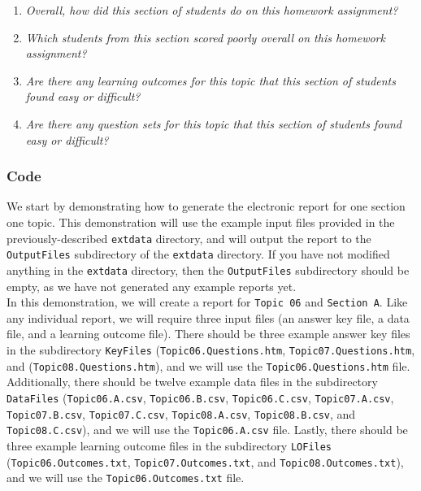 \documentclass{article}\usepackage[]{graphicx}\usepackage[]{color}
\numberwithin{equation}{section} %
\begin{document}
\begin{enumerate}
\item \textit{Overall, how did this section of students do on this homework assignment?}
\item \textit{Which students from this section scored poorly overall on this homework assignment?}
\item \textit{Are there any learning outcomes for this topic that this section of students found easy or difficult?}
\item \textit{Are there any question sets for this topic that this section of students found easy or difficult?}
\end{enumerate}

\subsubsection{Code}
\label{sec:codeOnce}

We start by demonstrating how to generate the electronic report for one section one topic. This demonstration will use the example input files provided in the previously-described \texttt{extdata} directory, and will output the report to the \texttt{OutputFiles} subdirectory of the \texttt{extdata} directory. If you have not modified anything in the \texttt{extdata} directory, then the \texttt{OutputFiles} subdirectory should be empty, as we have not generated any example reports yet. \\

In this demonstration, we will create a report for \texttt{Topic 06} and \texttt{Section A}. Like any individual report, we will require three input files (an answer key file, a data file, and a learning outcome file). There should be three example answer key files in the subdirectory \texttt{KeyFiles} (\texttt{Topic06.Questions.htm}, \texttt{Topic07.Questions.htm}, and (\texttt{Topic08.Questions.htm}), and we will use the \texttt{Topic06.Questions.htm} file. Additionally, there should be twelve example data files in the subdirectory \texttt{DataFiles} (\texttt{Topic06.A.csv}, \texttt{Topic06.B.csv}, \texttt{Topic06.C.csv}, \texttt{Topic07.A.csv}, \texttt{Topic07.B.csv}, \texttt{Topic07.C.csv}, \texttt{Topic08.A.csv}, \texttt{Topic08.B.csv}, and \texttt{Topic08.C.csv}), and we will use the \texttt{Topic06.A.csv} file. Lastly, there should be three example learning outcome files in the subdirectory \texttt{LOFiles} (\texttt{Topic06.Outcomes.txt}, \texttt{Topic07.Outcomes.txt}, and \texttt{Topic08.Outcomes.txt}), and we will use the \texttt{Topic06.Outcomes.txt} file. \\
\end{document}
